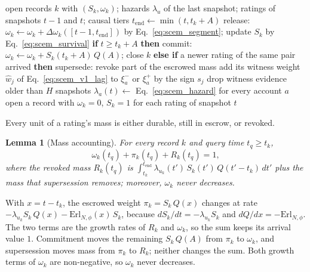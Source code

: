 \documentclass[lettersize,journal]{IEEEtran}
\newtheorem{lemma}{Lemma}
\begin{document}
\begin{algorithm}[!t]
\caption{SCEM: escrow update at snapshot $t$}
\label{alg:scem}
\footnotesize
\begin{algorithmic}[1]
\Require open records $k$ with $(S_k, \omega_k)$; hazards $\lambda_u$ of the last snapshot; ratings of snapshots $t-1$ and $t$; causal tiers
  \State $t_{\mathrm{end}} \gets \min(t, t_k + A)$
  \State release: $\omega_k \gets \omega_k + \Delta\omega_k([t-1, t_{\mathrm{end}}])$ by Eq.~\eqref{eq:scem_segment}; update $S_k$ by Eq.~\eqref{eq:scem_survival}
  \State \textbf{if} $t \ge t_k + A$ \textbf{then} commit: $\omega_k \gets \omega_k + S_k(t_k + A)\,Q(A)$; close $k$
  \State \textbf{else if} a newer rating of the same pair arrived \textbf{then} supersede: revoke part of the escrowed mass
\EndFor
{}
  \State add its witness weight $\hat{w}_j$ of Eq.~\eqref{eq:scem_v1_lag} to $\xi^{-}_a$ or $\xi^{+}_a$ by the sign $s_j$
\EndFor
\State drop witness evidence older than $H$ snapshots
\State $\lambda_a(t) \gets$ Eq.~\eqref{eq:scem_hazard} for every account $a$
\State open a record with $\omega_k = 0$, $S_k = 1$ for each rating of snapshot $t$
\end{algorithmic}
\end{algorithm}

Every unit of a rating's mass is either durable, still in escrow, or revoked.
\begin{lemma}[Mass accounting]
\label{lem:mass}
For every record $k$ and query time $t_q \ge t_k$,
\begin{equation}
\label{eq:scem_conservation}
\omega_k(t_q) + \pi_k(t_q) + R_k(t_q) = 1,
\end{equation}
where the revoked mass $R_k(t_q)$ is $\int_{t_k}^{t_{\mathrm{end}}} \lambda_{u_k}(t')\, S_k(t')\, Q(t'-t_k)\,dt'$ plus the mass that supersession removes; moreover, $\omega_k$ never decreases.
\end{lemma}
\begin{IEEEproof}
With $x = t - t_k$, the escrowed weight $\pi_k = S_k\,Q(x)$ changes at rate $-\lambda_{u_k} S_k\,Q(x) - \mathrm{Erl}_{N,\phi}(x)\,S_k$, because $dS_k/dt = -\lambda_{u_k} S_k$ and $dQ/dx = -\mathrm{Erl}_{N,\phi}$.
The two terms are the growth rates of $R_k$ and $\omega_k$, so the sum keeps its arrival value $1$.
Commitment moves the remaining $S_k\,Q(A)$ from $\pi_k$ to $\omega_k$, and supersession moves mass from $\pi_k$ to $R_k$; neither changes the sum. Both growth terms of $\omega_k$ are non-negative, so $\omega_k$ never decreases.
\end{IEEEproof}
\end{document}
